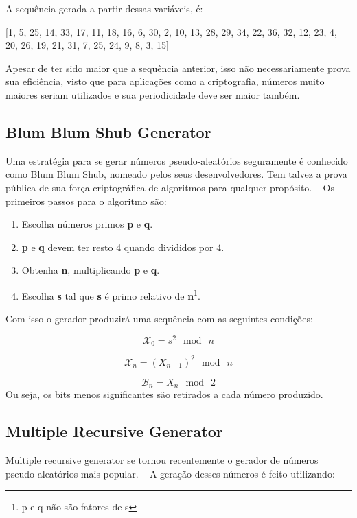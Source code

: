 A sequência gerada a partir dessas variáveis, é:

[1, 5, 25, 14, 33, 17, 11, 18, 16, 6, 30, 2, 10, 13, 28, 29, 34, 22, 36, 32, 12, 23, 4, 20, 26, 19, 21, 31, 7, 25, 24, 9, 8, 3, 15]

Apesar de ter sido maior que a sequência anterior, isso não necessariamente prova sua eficiência, visto que para aplicações como a criptografia, números muito maiores seriam utilizados e sua periodicidade deve ser maior também.


\subsection{Blum Blum Shub Generator}
Uma estratégia para se gerar números pseudo-aleatórios seguramente é conhecido como Blum Blum Shub, nomeado pelos seus desenvolvedores. Tem talvez a prova pública de sua força criptográfica de algoritmos para qualquer propósito. ~\cite{william-stallings} Os primeiros passos para o algoritmo são:

\begin{enumerate}
	\item Escolha números primos \textbf{p} e \textbf{q}.
	\item \textbf{p} e \textbf{q} devem ter resto 4 quando divididos por 4.
	\item Obtenha \textbf{n}, multiplicando \textbf{p} e \textbf{q}.
	\item Escolha \textbf{s} tal que \textbf{s} é primo relativo de \textbf{n}\footnote{p e q não são fatores de s}.
\end{enumerate}

Com isso o gerador produzirá uma sequência com as seguintes condições:

\begin{equation}
	\label{Equação para produzir a sequência}
	\mathcal{X}_0 = s^2\: \bmod \: n
\end{equation}

\begin{equation}
	\label{Equação para produzir a sequência}
	\mathcal{X}_n = (X_{n-1})^2 \: \bmod \: n
\end{equation}

\begin{equation}
	\label{Equação para produzir a sequência}
	\mathcal{B}_n = X_n \: \bmod \: 2
\end{equation}
Ou seja, os bits menos significantes são retirados a cada número produzido.

\subsection{Multiple Recursive Generator}
\label{multiple-recursive-generator}
Multiple recursive generator se tornou recentemente o gerador de números pseudo-aleatórios mais popular. ~\cite{lih-yuan} A geração desses números é feito utilizando:

